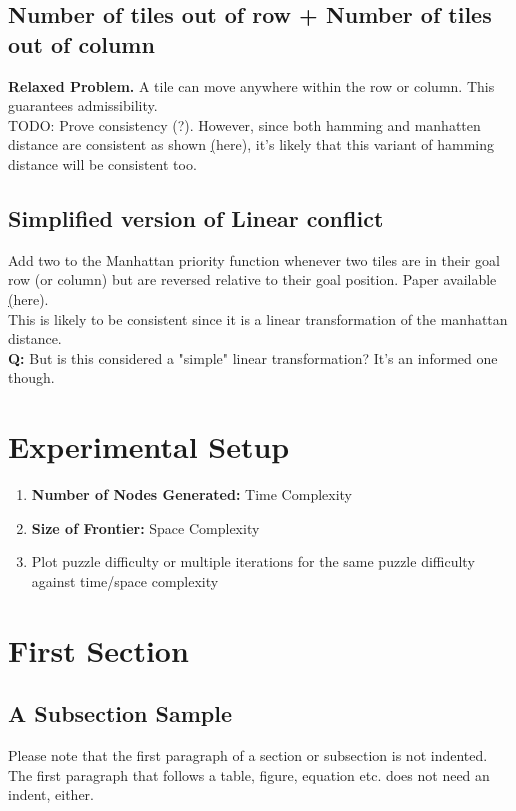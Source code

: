 \documentclass[runningheads]{llncs}
\begin{document}
\subsection{Number of tiles out of row + Number of tiles out of column} 
\textbf{Relaxed Problem.} A tile can move anywhere within the row or column. This guarantees admissibility. \\
TODO: Prove consistency (?). However, since both hamming and manhatten distance are consistent as shown \href{https://www.cs.princeton.edu/courses/archive/fall12/cos226/checklist/8puzzle.html}(here), 
it's likely that this variant of hamming distance will be consistent too.

\subsection{Simplified version of Linear conflict}
Add two to the Manhattan priority function whenever two tiles are in their goal row (or column) but are reversed relative to their goal position. Paper available \href{https://cse.sc.edu/~mgv/csce580sp15/gradPres/HanssonMayerYung1992.pdf}(here).\\
This is likely to be consistent since it is a linear transformation of the manhattan distance. \\ 
\textbf{Q:} But is this considered a "simple" linear transformation? It's an informed one though. 

\section{Experimental Setup}
\begin{enumerate}
    \item \textbf{Number of Nodes Generated:} Time Complexity
    \item \textbf{Size of Frontier:} Space Complexity
    \item Plot puzzle difficulty or multiple iterations for the same puzzle difficulty against time/space complexity 
\end{enumerate}

\section{First Section}
\subsection{A Subsection Sample}
Please note that the first paragraph of a section or subsection is
not indented. The first paragraph that follows a table, figure,
equation etc. does not need an indent, either.
\end{document}
